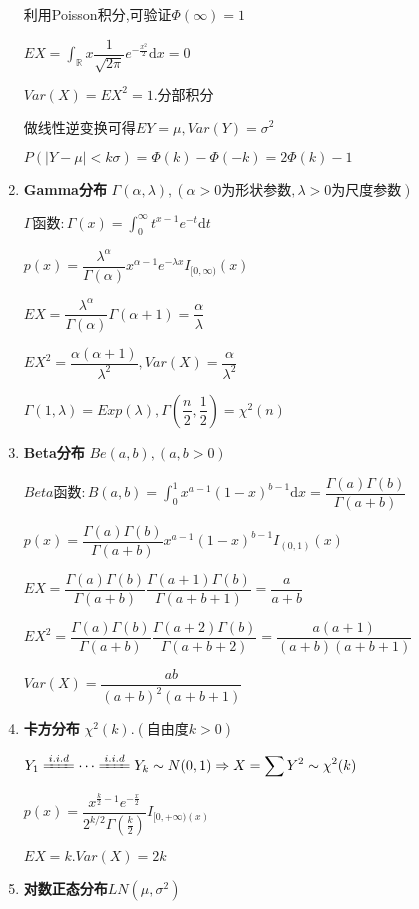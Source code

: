 \begin{enumerate}
	利用Poisson积分,可验证$\Phi(\infty) = 1$

  $EX = \int_{\mathbb{R}}{x\dfrac{1}{\sqrt{2\pi}}e^{-\frac{x^2}{2}}\mathrm{d}x} = 0$

	$ Var(X) = EX^2 = 1. 分部积分$

	做线性逆变换可得$EY = \mu, Var(Y) = \sigma^2$

	$ P(|Y-\mu| < k\sigma) = \Phi(k) - \Phi(-k) = 2\Phi(k)-1$

\item \textbf{Gamma分布} $\Gamma(\alpha, \lambda),(\alpha > 0为形状参数,\lambda>0为尺度参数)$

    $ \Gamma 函数: \Gamma(x) = \int_{0}^{\infty}t^{x-1}e^{-t}\mathrm{d}t$

	$ p(x) = \dfrac{\lambda^{\alpha}}{\Gamma(\alpha)}x^{\alpha - 1}e^{-\lambda x}I_{[0,\infty)}(x)$

	$ EX = \dfrac{\lambda^{\alpha}}{\Gamma(\alpha)}\Gamma(\alpha+1) = \dfrac{\alpha}{\lambda}$

	$ EX^2 = \dfrac{\alpha(\alpha+1)}{\lambda^2},Var(X) = \dfrac{\alpha}{\lambda^2}$

	$ \Gamma(1,\lambda )= Exp(\lambda), \Gamma(\dfrac{n}{2},\dfrac{1}{2}) = \chi ^2(n)$
  \item \textbf{Beta分布} $ Be(a,b),(a,b>0)$

    $ Beta函数:B(a,b) = \int_{0}^{1}{x^{a-1}(1-x)^{b-1}\mathrm{d}x} = \dfrac{\Gamma(a)\Gamma(b)}{\Gamma(a+b)}$

  $ p(x) = \dfrac{\Gamma(a)\Gamma(b)}{\Gamma(a+b)}x^{a-1}(1-x)^{b-1}I_{(0,1)}(x)$

    $ EX = \dfrac{\Gamma(a)\Gamma(b)}{\Gamma(a+b)}\dfrac{\Gamma(a+1)\Gamma(b)}{\Gamma(a+b+1)} = \dfrac{a}{a+b}$

    $ EX^2 = \dfrac{\Gamma(a)\Gamma(b)}{\Gamma(a+b)}\dfrac{\Gamma(a+2)\Gamma(b)}{\Gamma(a+b+2)} = \dfrac{a(a+1)}{(a+b)(a+b+1)}$

    $ Var(X) = \dfrac{ab}{(a+b)^2(a+b+1)}$

  \item \textbf{卡方分布} $ \chi^2(k).(自由度k>0)$

    $ Y_1 \xlongequal{i.i.d} \cdots \xlongequal{i.i.d} Y_k \sim N(0,1)
    \Rightarrow X = \sum{Y^2}\sim \chi^2(k)$

  $ p(x) = \dfrac{x^{\frac{k}{2}-1}e^{-\frac{x}{2}}}{2^{k/2}\Gamma(\frac{k}{2})} I_{[0,+\infty)(x)}$

    $ EX = k. Var(X) = 2k$

  \item \textbf{对数正态分布}$ LN(\mu, \sigma^2)$


\end{enumerate}

